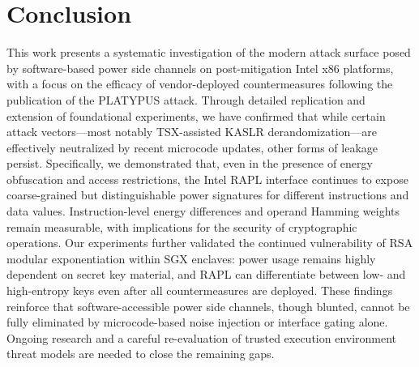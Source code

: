 \section{Conclusion}
This work presents a systematic investigation of the modern attack surface posed by
software-based power side channels on post-mitigation Intel x86 platforms, with a focus on the efficacy of vendor-deployed countermeasures following the publication of the PLATYPUS attack. Through detailed replication and extension of foundational experiments, we have confirmed that while certain attack vectors—most notably TSX-assisted KASLR derandomization—are effectively neutralized by recent microcode updates, other forms of leakage persist.
Specifically, we demonstrated that, even in the presence of energy obfuscation and
access restrictions, the Intel RAPL interface continues to expose coarse-grained but distinguishable power signatures for different instructions and data values. Instruction-level energy differences and operand Hamming weights remain measurable, with implications for the security of cryptographic operations. Our experiments further validated the continued vulnerability of RSA modular exponentiation within SGX enclaves: power usage remains highly dependent on secret key material, and RAPL can differentiate between low- and high-entropy keys even after all countermeasures are deployed.
These findings reinforce that software-accessible power side channels, though blunted, cannot be fully eliminated by microcode-based noise injection or interface gating alone. Ongoing research and a careful re-evaluation of trusted execution environment threat models are needed to close the remaining gaps.